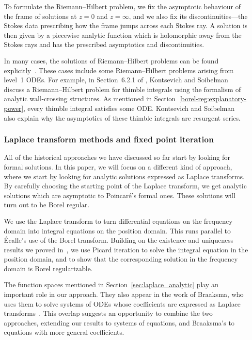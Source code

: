 \documentclass{article}
\theoremstyle{definition}
\theoremstyle{plain}
\begin{document}
To formulate the Riemann--Hilbert problem, we fix the asymptotic behaviour of the frame of solutions at $z = 0$ and $z = \infty$, and we also fix its discontinuities---the Stokes data prescribing how the frame jumps across each Stokes ray. A solution is then given by a piecewise analytic function which is holomorphic away from the Stokes rays and has the prescribed asymptotics and discontinuities.

In many cases, the solutions of Riemann--Hilbert problems can be found explicitly~\cite{Dubrovin-tt_star,Dubrovin-Heun,GMN1,Tom-RH-1,Tom-RH-conifold,BBS-RH}. These cases include some Riemann--Hilbert problems arising from level~1 ODEs. For example, in Section~6.2.1 of \cite{kontsevich2022analyticity}, Kontsevich and Soibelman discuss a Riemann--Hilbert problem for thimble integrals using the formalism of analytic wall-crossing structures. As mentioned in Section~\ref{borel-reg:explanatory-power}, every thimble integral satisfies some ODE. Kontsevich and Soibelman also explain why the asymptotics of these thimble integrals are resurgent series.
%
\subsubsection{Laplace transform methods and fixed point iteration}
%
All of the historical approaches we have discussed so far start by looking for formal solutions. In this paper, we will focus on a different kind of approach, where we start by looking for analytic solutions expressed as Laplace transforms. By carefully choosing the starting point of the Laplace transform, we get analytic solutions which are asymptotic to Poincar\'{e}'s formal ones. These solutions will turn out to be Borel regular.

We use the Laplace transform to turn differential equations on the frequency domain into integral equations on the position domain. This runs parallel to \'{E}calle's use of the Borel transform. Building on the existence and uniqueness results we proved in~\cite{reg-sing-volterra}, we use Picard iteration to solve the integral equation in the position domain, and to show that the corresponding solution in the frequency domain is Borel regularizable.

The function spaces mentioned in Section~\ref{sec:laplace_analytic} play an important role in our approach. They also appear in the work of Braaksma, who uses them to solve systems of ODEs whose coefficients are expressed as Laplace transforms~\cite{braaksma2006laplace}. This overlap suggests an opportunity to combine the two approaches, extending our results to systems of equations, and Braaksma's to equations with more general coefficients.
%
\end{document}
